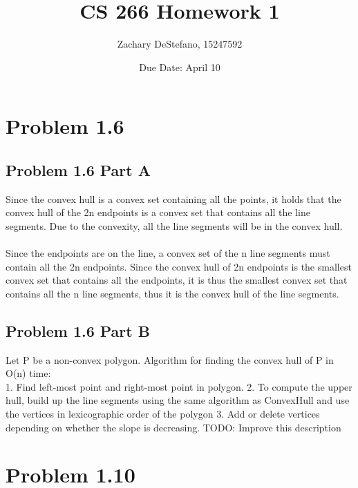 \documentclass[11pt,psfig]{article}
\begin{document}
\setlength{\parskip}{1.2ex plus0.3ex minus 0.3ex}


\thispagestyle{empty} \pagestyle{myheadings} 



\title{CS 266 Homework 1}
\author{Zachary DeStefano, 15247592}
\date{Due Date: April 10}

\maketitle

\vfill\eject

\section*{Problem 1.6}

\subsection*{Problem 1.6 Part A}

Since the convex hull is a convex set containing all the points, it holds that the convex hull of the 2n endpoints is a convex set that contains all the line segments. Due to the convexity, all the line segments will be in the convex hull. 
\\
\\
Since the endpoints are on the line, a convex set of the n line segments must contain all the 2n endpoints. Since the convex hull of 2n endpoints is the smallest convex set that contains all the endpoints, it is thus the smallest convex set that contains all the n line segments, thus it is the convex hull of the line segments. 

\subsection*{Problem 1.6 Part B}

Let P be a non-convex polygon. Algorithm for finding the convex hull of P in O(n) time:
\\
1. Find left-most point and right-most point in polygon. 
2. To compute the upper hull, build up the line segments using the same algorithm as ConvexHull and use the vertices in lexicographic order of the polygon
3. Add or delete vertices depending on whether the slope is decreasing. 
TODO: Improve this description

\section*{Problem 1.10}
\end{document}
